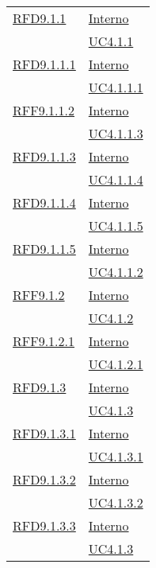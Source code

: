 \begin{longtable}{|>{\centering}m{5cm}|m{5cm}<{\centering}|}
\hyperlink{RFD9.1.1}{RFD9.1.1} & \hyperlink{Interno}{Interno}\\
& \hyperref[UC4.1.1]{UC4.1.1}\\ \hline

\hyperlink{RFD9.1.1.1}{RFD9.1.1.1} & \hyperlink{Interno}{Interno}\\
& \hyperref[UC4.1.1.1]{UC4.1.1.1}\\ \hline

\hyperlink{RFF9.1.1.2}{RFF9.1.1.2} & \hyperlink{Interno}{Interno}\\
& \hyperref[UC4.1.1.3]{UC4.1.1.3}\\ \hline

\hyperlink{RFD9.1.1.3}{RFD9.1.1.3} & \hyperlink{Interno}{Interno}\\
& \hyperref[UC4.1.1.4]{UC4.1.1.4}\\ \hline

\hyperlink{RFD9.1.1.4}{RFD9.1.1.4} & \hyperlink{Interno}{Interno}\\
& \hyperref[UC4.1.1.5]{UC4.1.1.5}\\ \hline

\hyperlink{RFD9.1.1.5}{RFD9.1.1.5} & \hyperlink{Interno}{Interno}\\
& \hyperref[UC4.1.1.2]{UC4.1.1.2}\\ \hline

\hyperlink{RFF9.1.2}{RFF9.1.2} & \hyperlink{Interno}{Interno}\\
& \hyperref[UC4.1.2]{UC4.1.2}\\ \hline

\hyperlink{RFF9.1.2.1}{RFF9.1.2.1} & \hyperlink{Interno}{Interno}\\
& \hyperref[UC4.1.2.1]{UC4.1.2.1}\\ \hline

\hyperlink{RFD9.1.3}{RFD9.1.3} & \hyperlink{Interno}{Interno}\\
& \hyperref[UC4.1.3]{UC4.1.3}\\ \hline

\hyperlink{RFD9.1.3.1}{RFD9.1.3.1} & \hyperlink{Interno}{Interno}\\
& \hyperref[UC4.1.3.1]{UC4.1.3.1}\\ \hline

\hyperlink{RFD9.1.3.2}{RFD9.1.3.2} & \hyperlink{Interno}{Interno}\\
& \hyperref[UC4.1.3.2]{UC4.1.3.2}\\ \hline

\hyperlink{RFD9.1.3.3}{RFD9.1.3.3} & \hyperlink{Interno}{Interno}\\
& \hyperref[UC4.1.3]{UC4.1.3}\\ \hline


\end{longtable}
